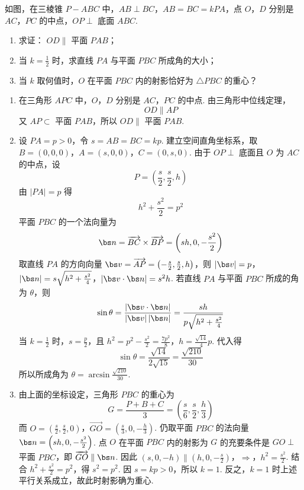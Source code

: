\begin{problem}
如图，在三棱锥 \(P - ABC\) 中，\(AB \perp BC\)，\(AB = BC = kPA\)，点 \(O\)，\(D\) 分别是 \(AC\)，\(PC\) 的中点，\(OP \perp\) 底面 \(ABC\).
\begin{enumerate}
\item 求证： \(OD \parallel\) 平面 \(PAB\)；
\item 当 \(k = \frac{1}{2}\) 时，求直线 \(PA\) 与平面 \(PBC\) 所成角的大小；
\item 当 \(k\) 取何值时，\(O\) 在平面 \(PBC\) 内的射影恰好为 \(\triangle PBC\) 的重心？
\end{enumerate}


\begin{solution}
\begin{enumerate}
\item 在三角形 \(APC\) 中，\(O\)，\(D\) 分别是 \(AC\)，\(PC\) 的中点. 由三角形中位线定理，
\[
OD\parallel AP
\]
又 \(AP\subset\) 平面 \(PAB\)，所以 \(OD\parallel\) 平面 \(PAB\).

\item 设 \(PA=p>0\)，令 \(s=AB=BC=kp\). 建立空间直角坐标系，取
\(B=(0,0,0)\)，\(A=(s,0,0)\)，\(C=(0,s,0)\).
由于 \(OP\perp\) 底面且 \(O\) 为 \(AC\) 的中点，设
\[
P=\left(\frac{s}{2},\frac{s}{2},h\right)
\]
由 \(|PA|=p\) 得
\[
h^2+\frac{s^2}{2}=p^2
\]
平面 \(PBC\) 的一个法向量为
\[
\bs n=\overrightarrow{BC}\times\overrightarrow{BP}
=\left(sh,0,-\frac{s^2}{2}\right)
\]
取直线 \(PA\) 的方向向量 \(\bs v=\overrightarrow{AP}=\left(-\frac{s}{2},\frac{s}{2},h\right)\)，则
\(|\bs v|=p\)，\(|\bs n|=s\sqrt{h^2+\frac{s^2}{4}}\)，\(|\bs v\cdot\bs n|=s^2h\).
若直线 \(PA\) 与平面 \(PBC\) 所成的角为 \(\theta\)，则
\[
\sin\theta=\frac{|\bs v\cdot\bs n|}{|\bs v|\,|\bs n|}
=\frac{sh}{p\sqrt{h^2+\frac{s^2}{4}}}
\]
当 \(k=\frac12\) 时，\(s=\frac p2\)，且
\(h^2=p^2-\frac{s^2}{2}=\frac{7p^2}{8}\)，\(h=\frac{\sqrt{14}}{4}p\).
代入得
\[
\sin\theta=\frac{\sqrt{14}}{2\sqrt{15}}=\frac{\sqrt{210}}{30}
\]
所以所成角为
\(\displaystyle\theta=\arcsin\frac{\sqrt{210}}{30}\).

\item 由上面的坐标设定，三角形 \(PBC\) 的重心为
\[
G=\frac{P+B+C}{3}=\left(\frac{s}{6},\frac{s}{2},\frac{h}{3}\right)
\]
而
\(O=\left(\frac{s}{2},\frac{s}{2},0\right)\)，\(\overrightarrow{GO}=\left(\frac{s}{3},0,-\frac{h}{3}\right)\).
仍取平面 \(PBC\) 的法向量 \(\bs n=\left(sh,0,-\frac{s^2}{2}\right)\). 点 \(O\) 在平面 \(PBC\) 内的射影为 \(G\) 的充要条件是 \(GO\perp\) 平面 \(PBC\)，即 \(\overrightarrow{GO}\parallel\bs n\). 因此
\(\left(s,0,-h\right)\parallel\left(h,0,-\frac{s}{2}\right)\)，\(\Longrightarrow\)，\(h^2=\frac{s^2}{2}\).
结合 \(h^2+\frac{s^2}{2}=p^2\)，得 \(s^2=p^2\). 因 \(s=kp>0\)，所以 \(k=1\). 反之，\(k=1\) 时上述平行关系成立，故此时射影确为重心.
\end{enumerate}
\end{solution}
\end{problem}

